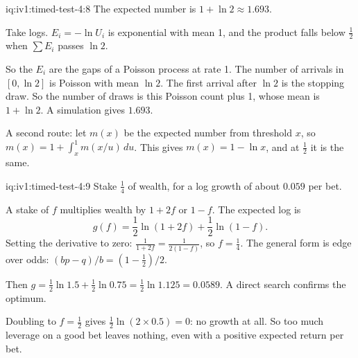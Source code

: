 \begin{solution}{iq:iv1:timed-test-4:8}
The expected number is $1 + \ln 2 \approx 1.693$.

Take logs. $E_i = -\ln U_i$ is exponential with mean 1, and the product falls below $\frac12$ when $\sum E_i$ passes $\ln 2$.

So the $E_i$ are the gaps of a Poisson process at rate 1. The number of arrivals in $[0, \ln 2]$ is Poisson with mean $\ln 2$. The first arrival after $\ln 2$ is the stopping draw. So the number of draws is this Poisson count plus 1, whose mean is $1 + \ln 2$. A simulation gives $1.693$.

A second route: let $m(x)$ be the expected number from threshold $x$, so $m(x) = 1 + \int_x^1m(x/u)\,du$. This gives $m(x) = 1 - \ln x$, and at $\frac12$ it is the same.


\end{solution}

\begin{solution}{iq:iv1:timed-test-4:9}
Stake $\frac14$ of wealth, for a log growth of about $0.059$ per bet.

A stake of $f$ multiplies wealth by $1 + 2f$ or $1 - f$. The expected log is
\[
g(f) = \frac12\ln(1 + 2f) + \frac12\ln(1 - f).
\]
Setting the derivative to zero: $\frac{1}{1 + 2f} = \frac{1}{2(1 - f)}$, so $f = \frac14$. The general form is edge over odds: $(bp - q)/b = (1 - \frac12)/2$.

Then $g = \frac12\ln 1.5 + \frac12\ln 0.75 = \frac12\ln 1.125 = 0.0589$. A direct search confirms the optimum.

Doubling to $f = \frac12$ gives $\frac12\ln(2 \times 0.5) = 0$: no growth at all. So too much leverage on a good bet leaves nothing, even with a positive expected return per bet.

\end{solution}

